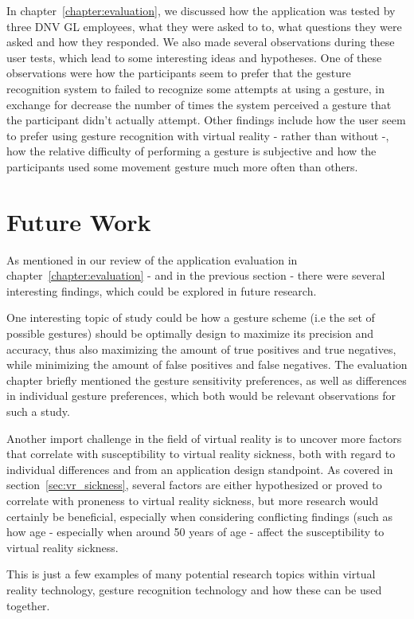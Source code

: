In chapter~\ref{chapter:evaluation}, we discussed how the application was tested by three DNV GL employees, what they were asked to to, what questions they 
were asked and how they responded. We also made several observations during these user tests, which lead to some interesting ideas and hypotheses. 
One of these observations were how the participants seem to prefer that the gesture recognition system to failed to recognize some attempts at using a gesture,
in exchange for decrease the number of times the system perceived a gesture that the participant didn't actually attempt. 
Other findings include how the user seem to prefer using gesture recognition with virtual reality - rather than without -, how the relative difficulty of performing 
a gesture is subjective and how the participants used some movement gesture much more often than others.

\section{Future Work}
As mentioned in our review of the application evaluation in chapter~\ref{chapter:evaluation} - and in the previous section - there were several interesting findings, 
which could be explored in future research. 

One interesting topic of study could be how a gesture scheme (i.e the set of possible gestures) should be optimally design to maximize its precision 
and accuracy, thus also maximizing the amount of true positives and true negatives, while minimizing the amount of false positives and false negatives. 
The evaluation chapter briefly mentioned the gesture sensitivity preferences, as well as differences in individual gesture preferences, which both
would be relevant observations for such a study.

Another import challenge in the field of virtual reality is to uncover more factors that correlate with susceptibility to virtual reality sickness, 
both with regard to individual differences and from an application design standpoint. As covered in section~\vref{sec:vr_sickness}, several factors are either hypothesized or 
proved to correlate with proneness to virtual reality sickness, but more research would certainly be beneficial, especially when considering conflicting findings (such as 
how age - especially when around 50 years of age - affect the susceptibility to virtual reality sickness.  

This is just a few examples of many potential research topics within virtual reality technology, gesture recognition technology and how these can be used together.


